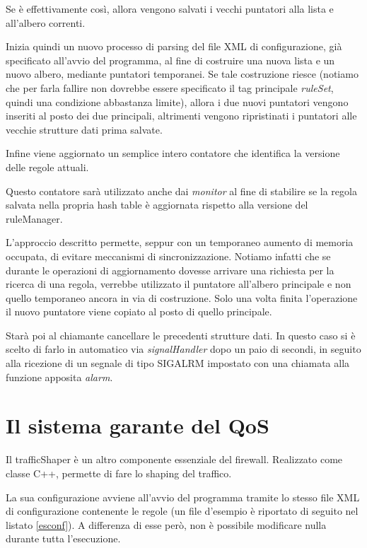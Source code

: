 Se è effettivamente così, allora vengono salvati i vecchi puntatori alla lista e all'albero correnti.

Inizia quindi un nuovo processo di parsing del file XML di configurazione, già specificato all'avvio del programma, al fine di costruire una nuova lista e un nuovo albero, mediante puntatori temporanei. Se tale costruzione riesce (notiamo che per farla fallire non dovrebbe essere specificato il tag principale \emph{ruleSet}, quindi una condizione abbastanza limite), allora i due nuovi puntatori vengono inseriti al posto dei due principali, altrimenti vengono ripristinati i puntatori alle vecchie strutture dati prima salvate.

Infine viene aggiornato un semplice intero contatore che identifica la versione delle regole attuali.

Questo contatore sarà utilizzato anche dai \emph{monitor} al fine di stabilire se la regola salvata nella propria hash table è aggiornata rispetto alla versione del ruleManager.

L'approccio descritto permette, seppur con un temporaneo aumento di memoria occupata, di evitare meccanismi di sincronizzazione. Notiamo infatti che se durante le operazioni di aggiornamento dovesse arrivare una richiesta per la ricerca di una regola, verrebbe utilizzato il puntatore all'albero principale e non quello temporaneo ancora in via di costruzione. Solo una volta finita l'operazione il nuovo puntatore viene copiato al posto di quello principale.

Starà poi al chiamante cancellare le precedenti strutture dati. In questo caso si è scelto di farlo in automatico via \emph{signalHandler} dopo un paio di secondi, in seguito alla ricezione di un segnale di tipo SIGALRM impostato con una chiamata alla funzione apposita \emph{alarm}.

\section{Il sistema garante del QoS}

Il trafficShaper è un altro componente essenziale del firewall. Realizzato come classe C++, permette di fare lo shaping del traffico.

La sua configurazione avviene all'avvio del programma tramite lo stesso file XML di configurazione contenente le regole (un file d'esempio è riportato di seguito nel listato \ref{esconf}). A differenza di esse però, non è possibile modificare nulla durante tutta l'esecuzione.

